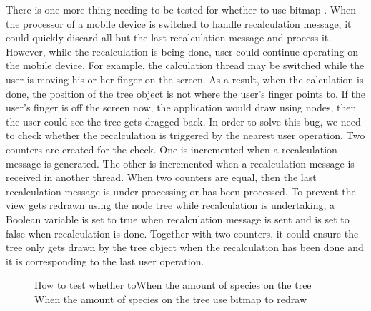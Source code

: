 \documentclass[MSc]{icldt}
\begin{document}
There is one more thing needing to be tested for whether to use bitmap . When the processor of a mobile device is switched to handle recalculation message, it could quickly discard all but the last recalculation message and process it. However, while the recalculation is being done, user could continue operating on the mobile device. For example, the calculation thread may be switched while the user is moving his or her finger on the screen. As a result, when the calculation is done, the position of the tree object is not where the user's finger points to. If the user's finger is off the screen now, the application would draw using nodes, then the user could see the tree gets dragged back. In order to solve this bug, we need to check whether the recalculation is triggered by the nearest user operation. Two counters are created for the check. One is incremented when a recalculation message is generated. The other is incremented when a recalculation message is received in another thread. When two counters are equal, then the last recalculation message is under processing or has been processed. To prevent the view gets redrawn using the node tree while recalculation is undertaking, a Boolean variable is set to true when recalculation message is sent and is set to false when recalculation is done. Together with two counters, it could ensure the tree only gets drawn by the tree object when the recalculation has been done and it is corresponding to the last user operation. 

\begin{figure}[H]
\caption{How to test whether toWhen the amount of species on the tree When the amount of species on the tree  use bitmap to redraw}
\end{figure}
\end{document}
